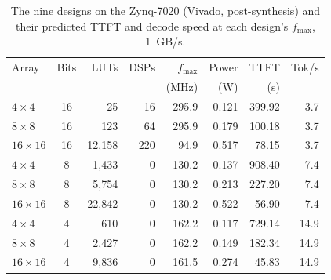 \begin{table}[t]
\centering
\small
\setlength{\tabcolsep}{3.5pt}
\caption{The nine designs on the Zynq-7020 (Vivado, post-synthesis) and their predicted TTFT and decode speed at each design's $f_{\max}$, 1~GB/s.}
\label{tab:designs}
\begin{tabular}{l c r r r r r r}
\hline
Array & Bits & LUTs & DSPs & $f_{\max}$ & Power & TTFT & Tok/s \\
      &      &      &      & (MHz)      & (W)   & (s)  &       \\
\hline
$4\times4$ & 16 & 25 & 16 & 295.9 & 0.121 & 399.92 & 3.7 \\
$8\times8$ & 16 & 123 & 64 & 295.9 & 0.179 & 100.18 & 3.7 \\
$16\times16$ & 16 & 12,158 & 220 & 94.9 & 0.517 & 78.15 & 3.7 \\
$4\times4$ & 8 & 1,433 & 0 & 130.2 & 0.137 & 908.40 & 7.4 \\
$8\times8$ & 8 & 5,754 & 0 & 130.2 & 0.213 & 227.20 & 7.4 \\
$16\times16$ & 8 & 22,842 & 0 & 130.2 & 0.522 & 56.90 & 7.4 \\
$4\times4$ & 4 & 610 & 0 & 162.2 & 0.117 & 729.14 & 14.9 \\
$8\times8$ & 4 & 2,427 & 0 & 162.2 & 0.149 & 182.34 & 14.9 \\
$16\times16$ & 4 & 9,836 & 0 & 161.5 & 0.274 & 45.83 & 14.9 \\
\hline
\end{tabular}
\end{table}
